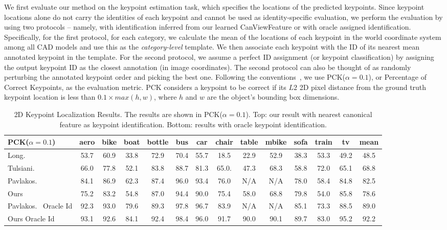 \documentclass[runningheads]{llncs}
\begin{document}
We first evaluate our method on the keypoint estimation task, which specifies the locations of the predicted keypoints. 
Since keypoint locations alone do not carry the identities of each keypoint and cannot be used as identity-specific evaluation, we perform the evaluation by using two protocols --
namely, with identification inferred from our learned CanViewFeature or with oracle assigned identification.
Specifically, for the first protocol, for each category, we calculate the mean of the locations of each keypoint in the world coordinate system among all CAD models and use this as the \emph{category-level} template. 
We then associate each keypoint with the ID of its nearest mean annotated keypoint in the template.
For the second protocol, we assume a perfect ID assignment (or keypoint classification) by assigning the output keypoint ID as the closest annotation (in image coordinates).
The second protocol can also be thought of as randomly perturbing the annotated keypoint order and picking the best one. 
Following the conventions~\cite{long2014convnets,tulsiani2015viewpoints}, we use PCK($\alpha = 0.1$), or Percentage of Correct Keypoints, as the evaluation metric. PCK considers a keypoint to be correct if its $L2$ 2D pixel distance from the ground truth keypoint location is less than $0.1 \times max(h, w)$, where $h$ and $w$ are the object's bounding box dimensions.

\begin{center}
\begin{table*}[t]
\scriptsize
\centering
\begin{tabular}{l|cccccccccccc|c}
\hline
PCK($\alpha=0.1$) & {{}aero} & {{}bike} & {{}boat} & {{}bottle} & {{}bus} & {{}car} & {{}chair} & {{}table} & {{}mbike} & {{}sofa} & {{}train} & { {}tv} & {mean} \\
\hline
{{}{Long. \cite{long2014convnets}}} & 53.7 & 60.9 & 33.8 & 72.9 & 70.4 & 55.7 & 18.5 & 22.9 & 52.9 & 38.3 & 53.3 & 49.2 & 48.5 \\
{Tulsiani.~\cite{tulsiani2015viewpoints}} & 66.0 & 77.8 & 52.1 & 83.8 & 88.7 & 81.3 & 65.0.& 47.3 & 68.3 & 58.8 & 72.0 & 65.1 & 68.8 \\
{Pavlakos.~\cite{pavlakos20176}} & 84.1 & 86.9 & 62.3 & 87.4 & 96.0 & 93.4 & 76.0 & N/A & N/A & 78.0 & 58.4 & 84.8 & 82.5 \\
Ours & 75.2 & 83.2 & 54.8 & 87.0 & 94.4 & 90.0 & 75.4 & 58.0 & 68.8 & 79.8 & 54.0 & 85.8 & 78.6 \\
\hline
\hline
{Pavlakos.~\cite{pavlakos20176} Oracle Id} & 92.3 & 93.0 & 79.6 & 89.3 & 97.8 & 96.7 & 83.9 & N/A & N/A & 85.1 & 73.3 & 88.5 & 89.0 \\
Ours Oracle Id & 93.1 & 92.6 & 84.1 & 92.4 & 98.4 & 96.0 & 91.7 & 90.0 & 90.1 & 89.7 & 83.0 & 95.2 & 92.2 \\
\hline
\end{tabular}
\caption{2D Keypoint Localization Results. The results are shown in PCK($\alpha = 0.1$). Top: our result with nearest canonical feature as keypoint identification. Bottom: results with oracle keypoint identification.}
\label{table:kpsGtEval}
\end{table*}
\end{center}
\end{document}
